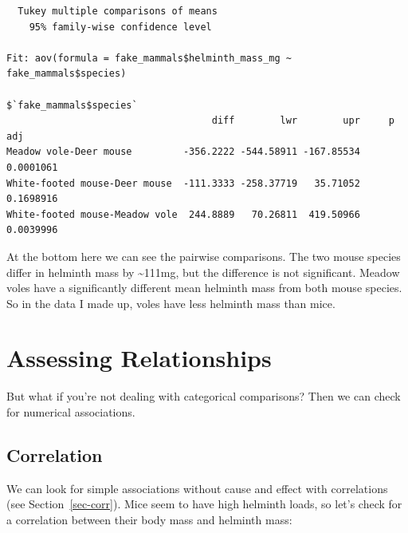 \documentclass[
  letterpaper,
  DIV=11,
  numbers=noendperiod]{scrreprt}
\newenvironment{Shaded}{\begin{snugshade}}{\end{snugshade}}
\newcommand{\DocumentationTok}[1]{\textcolor[rgb]{0.37,0.37,0.37}{\textit{#1}}}
\newcommand{\FunctionTok}[1]{\textcolor[rgb]{0.28,0.35,0.67}{#1}}
\newcommand{\NormalTok}[1]{\textcolor[rgb]{0.00,0.23,0.31}{#1}}
\newcommand{\OtherTok}[1]{\textcolor[rgb]{0.00,0.23,0.31}{#1}}
\newcommand{\SpecialCharTok}[1]{\textcolor[rgb]{0.37,0.37,0.37}{#1}}
\newcommand{\StringTok}[1]{\textcolor[rgb]{0.13,0.47,0.30}{#1}}
\begin{document}
\begin{verbatim}
  Tukey multiple comparisons of means
    95% family-wise confidence level

Fit: aov(formula = fake_mammals$helminth_mass_mg ~ fake_mammals$species)

$`fake_mammals$species`
                                    diff        lwr        upr     p adj
Meadow vole-Deer mouse         -356.2222 -544.58911 -167.85534 0.0001061
White-footed mouse-Deer mouse  -111.3333 -258.37719   35.71052 0.1698916
White-footed mouse-Meadow vole  244.8889   70.26811  419.50966 0.0039996
\end{verbatim}

At the bottom here we can see the pairwise comparisons. The two mouse
species differ in helminth mass by \textasciitilde111mg, but the
difference is not significant. Meadow voles have a significantly
different mean helminth mass from both mouse species. So in the data I
made up, voles have less helminth mass than mice.

\section{Assessing Relationships}\label{assessing-relationships}

But what if you're not dealing with categorical comparisons? Then we can
check for numerical associations.

\subsection{Correlation}\label{correlation}

We can look for simple associations without cause and effect with
correlations (see Section~\ref{sec-corr}). Mice seem to have high
helminth loads, so let's check for a correlation between their body mass
and helminth mass:

\begin{Shaded}
\end{Shaded}
\end{document}

